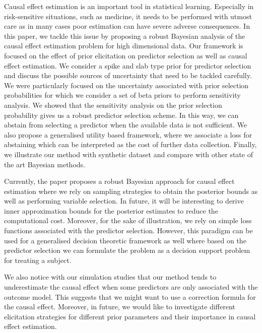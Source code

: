 \documentclass[preprint,12pt]{elsarticle}
\begin{document}
Causal effect estimation is an important tool in statistical learning.
Especially in risk-sensitive situations, such as medicine, it needs to
be performed with utmost care as in many cases poor estimation can have severe adverse consequences.
In this paper, we tackle this issue by proposing a robust Bayesian analysis of the causal 
effect estimation problem for high dimensional data. Our 
framework is focused on the effect of prior elicitation on
predictor selection
as well as causal effect estimation. We consider a spike and slab type
prior for predictor selection and discuss the possible sources of uncertainty that
need to be tackled carefully. We were particularly focused on the uncertainty associated
with prior selection probabilities for which we consider a set of beta priors to perform
sensitivity analysis. We showed that the sensitivity analysis on the prior selection probability
gives us a robust predictor selection scheme. In this way, we can abstain from selecting
a predictor when the available data is not sufficient. We also propose a generalised
utility based framework, where we associate a loss for abstaining which can be interpreted 
as the cost of further data collection. Finally, we illustrate our method with synthetic dataset
and compare with other state of the art Bayesian methods. 


Currently, the paper proposes a robust Bayesian approach for causal effect estimation where
we rely on sampling strategies to obtain the posterior bounds as well as performing 
variable selection. In future, it will be interesting to derive inner approximation bounds
for the posterior estimates to reduce the computational cost. Moreover, for the sake of
illustration, we rely on simple loss functions
associated with the predictor selection. However,
this paradigm can be used for a generalised
decision theoretic framework as well where based on
the predictor selection we can formulate the 
problem as a decision support problem for treating a subject.

We also notice with our simulation studies that our
method tends to underestimate the causal effect
when some predictors are only associated with the
outcome model. This suggests that we might want
to use a correction formula for the causal effect.
Moreover, in future, we would
like to investigate different elicitation strategies for different prior parameters and their importance in causal effect estimation. 
\end{document}
